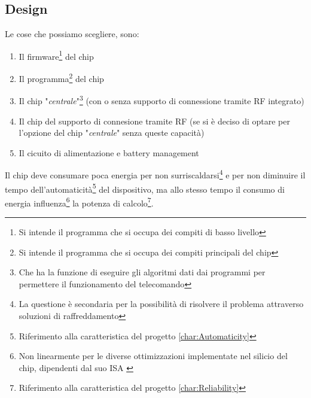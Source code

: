 \documentclass[a4paper, 10pt, final]{article} %
\newcommand{\parenciteit}[2]{\textit{\parencite[#1]{#2}}} %
\begin{document}
    \begin{samepage}
        \subsection{Design}\label{sec:MotherboardDesign}
        \noindent Le cose che possiamo scegliere, sono:
        \begin{enumerate}[label=\emph{(\arabic*)}]
            \item Il firmware\footnote{Si intende il programma che si occupa dei compiti di basso livello} del chip
            \item Il programma\footnote{Si intende il programma che si occupa dei compiti principali del chip} del chip
            \item Il chip "\emph{centrale}"\footnote{Che ha la funzione di eseguire gli algoritmi dati dai programmi per permettere il funzionamento del telecomando} (con o senza supporto di connessione tramite RF integrato)
            \item Il chip del supporto di connesione tramite RF (se si \`{e} deciso di optare per l'opzione del chip "\emph{centrale}" senza queste capacit\`{a})
            \item Il cicuito di alimentazione e battery management
        \end{enumerate}
    \end{samepage}

    Il chip deve consumare poca energia per non surriscaldarsi\footnote{La questione \`{e} secondaria per la possibilit\`{a} di risolvere il problema attraverso soluzioni di raffreddamento} e per non diminuire il tempo dell'automaticit\`{a}\footnote{Riferimento alla caratteristica del progetto \ref{char:Automaticity}} del dispositivo, ma allo stesso tempo il consumo di energia influenza\footnote{Non linearmente per le diverse ottimizzazioni implementate nel silicio del chip, dipendenti dal suo ISA \parenciteit{}{ISA:Wiki}} la potenza di calcolo\footnote{Riferimento alla caratteristica del progetto \ref{char:Reliability}}.
\end{document}
